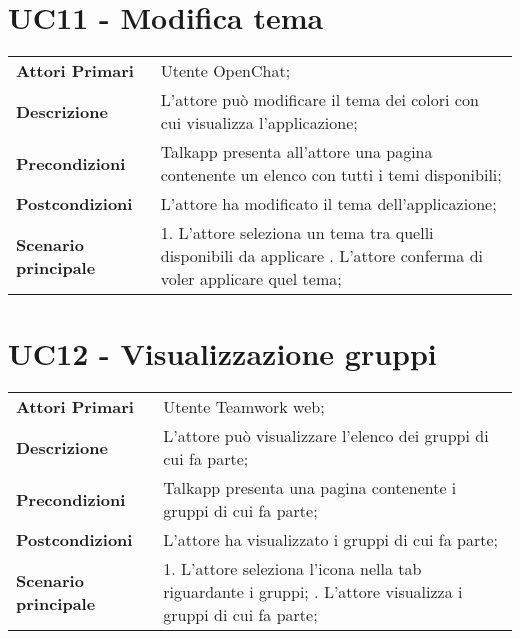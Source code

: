 \section{UC11 - Modifica tema}
	\begin{center}
	\bgroup
	\def\arraystretch{1.8}     
	\begin{longtable}{  p{4cm} | p{9.5cm} } 
		\textbf{Attori Primari} & Utente OpenChat; \\ 
		\textbf{Descrizione} &  L'attore può modificare il tema dei colori con cui visualizza l'applicazione; \\ 
		\textbf{Precondizioni}  & Talkapp presenta all'attore una pagina contenente un elenco con tutti i temi disponibili; \\
		\textbf{Postcondizioni} & L'attore ha modificato il tema dell'applicazione; \\ 
		\textbf{Scenario principale} & 
		1. L'attore seleziona un tema tra quelli disponibili da applicare \newline
		2. L'attore conferma di voler applicare quel tema;
	\end{longtable}
	\egroup
\end{center}

\section{UC12 - Visualizzazione gruppi}
	\begin{center}
	\bgroup
	\def\arraystretch{1.8}     
	\begin{longtable}{  p{4cm} | p{9.5cm} } 
		\textbf{Attori Primari} & Utente Teamwork web; \\ 
		\textbf{Descrizione} &  L'attore può visualizzare l'elenco dei gruppi di cui fa parte; \\ 
		\textbf{Precondizioni}  & Talkapp presenta una pagina contenente i gruppi di cui fa parte; \\
		\textbf{Postcondizioni} & L'attore ha visualizzato i gruppi di cui fa parte; \\ 
		\textbf{Scenario principale} & 
		1. L'attore seleziona l'icona nella tab riguardante i gruppi; \newline
		2. L'attore visualizza i gruppi di cui fa parte;
	\end{longtable}
	\egroup
\end{center}

